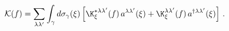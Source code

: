 \begin{equation}
{\cal
K}(f)=\sum_{\lambda\lambda'}\int_{\gamma}d\sigma_{\gamma}(\xi)
\left[\K^{*\lambda\lambda'}_{\xi}(f)\,a^{\lambda\lambda'}(\xi)
+\K^{\lambda\lambda'}_{\xi}(f)\,a^{\dagger\lambda\lambda'}(\xi)\right]\,.
\end{equation}

